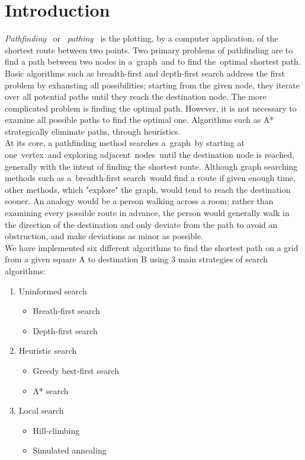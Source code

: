 \documentclass[a4paper]{article}
\begin{document}
\section{Introduction}

\emph{Pathfinding}  or  \emph{pathing}  is the plotting, by a computer application, of the shortest route between two points. Two primary problems of pathfinding are to find a path between two nodes in a graph and to find the optimal shortest path. Basic algorithms such as breadth-first and depth-first search address the first problem by exhausting all possibilities; starting from the given node, they iterate over all potential paths until they reach the destination node. The more complicated problem is finding the optimal path. However, it is not necessary to examine all possible paths to find the optimal one. Algorithms such as A* strategically eliminate paths, through heuristics.\\

At its core, a pathfinding method searches a graph by starting at one vertex and exploring adjacent nodes until the destination node is reached, generally with the intent of finding the shortest route. Although graph searching methods such as a breadth-first search would find a route if given enough time, other methods, which "explore" the graph, would tend to reach the destination sooner. An analogy would be a person walking across a room; rather than examining every possible route in advance, the person would generally walk in the direction of the destination and only deviate from the path to avoid an obstruction, and make deviations as minor as possible.\\

We have implemented six different algorithms to find the shortest path on a grid from a given square A to destination B using 3 main strategies of search algorithms:\\

\begin{enumerate}
\item Uninformed search
	\begin{itemize}
		\item Breath-first search
		\item Depth-first search
	\end{itemize}
\item Heuristic search
	\begin{itemize}
		\item Greedy best-first search
		\item A* search
	\end{itemize}
\item Local search
	\begin{itemize}
		\item Hill-climbing
		\item Simulated annealing
	\end{itemize}
\end{enumerate}
\end{document}

